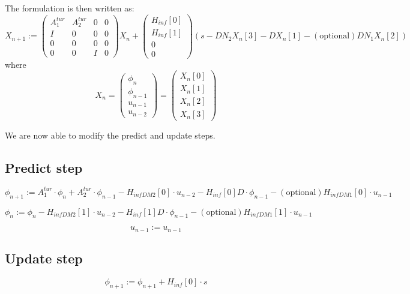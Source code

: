 \documentclass[a4,10pt]{article}
\begin{document}
The formulation is then written as:
\begin{equation}
X_{n+1}:=\begin{pmatrix}
A^{tur}_1 &A^{tur}_2&0&0\\
I&0&0&0\\
0&0&0&0\\
0&0&I&0
\end{pmatrix}X_n+\begin{pmatrix}H_{inf}[0]\\H_{inf}[1]\\0\\0\end{pmatrix}(s-DN_2X_n[3]-DX_n[1]
-\mathrm{(optional)} DN_1X_n[2])
\label{eq:Kalman2}
\end{equation}
where
\begin{equation}
X_n=\begin{pmatrix}
\phi_{n}\\
\phi_{n-1}\\
u_{n-1}\\
u_{n-2}\end{pmatrix}=\begin{pmatrix}
X_n[0]\\X_n[1]\\X_n[2]\\X_n[3]
\end{pmatrix}
\end{equation}

We are now able to modify the predict and update steps.


\subsection{Predict step}
\begin{equation}
\phi_{n+1} := A^{tur}_1 \cdot \phi_{n}+ A^{tur}_2 \cdot \phi_{n-1} -
H_{infDM2}[0] \cdot u_{n-2} - H_{inf}[0]D\cdot\phi_{n-1}
-\mathrm{(optional)} H_{infDM1}[0] \cdot u_{n-1}
\end{equation}

\begin{equation}
\phi_n := \phi_{n} - H_{infDM2}[1] \cdot u_{n-2}-
H_{inf}[1]D\cdot\phi_{n-1} - \mathrm{(optional)} H_{infDM1}[1] \cdot u_{n-1}
\end{equation}

\begin{equation}
u_{n-1} :=u_{n-1}
\end{equation}

\subsection{Update step}
\begin{equation}
\phi_{n+1} := \phi_{n+1} + H_{inf}[0] \cdot s
\end{equation}
\end{document}
